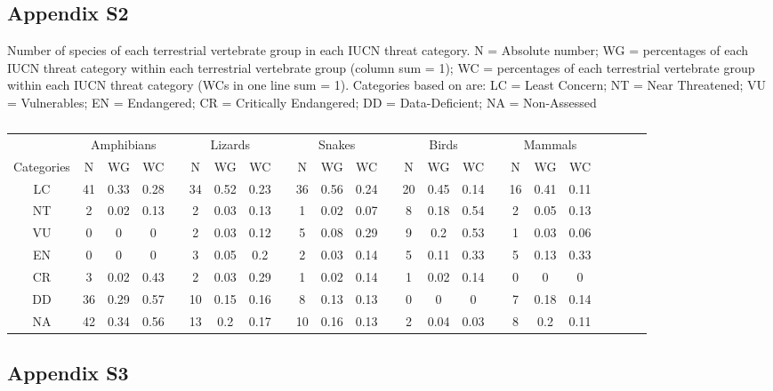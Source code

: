\documentclass[12pt,openright,oneside,a4paper,english]{abntex2}
\begin{document}
\subsection*{Appendix S2}\label{sup:3-s2}

\noindent
Number of species of each terrestrial vertebrate group in each IUCN threat category. N = Absolute number; WG = percentages of each IUCN threat category within each terrestrial vertebrate group (column sum = 1); WC = percentages of each terrestrial vertebrate group within each IUCN threat category (WCs in one line sum = 1). Categories based on \citep{IUCN2022} are: LC = Least Concern; NT = Near Threatened; VU = Vulnerables; EN = Endangered; CR = Critically Endangered; DD = Data-Deficient; NA = Non-Assessed

\begin{table}[H]
	\centering
	\caption*{}
	\scriptsize
	\begin{tabular}{cccccccccccccccccccccccc}
		\hline
		& \multicolumn{3}{c}{Amphibians} && \multicolumn{3}{c}{Lizards} && \multicolumn{3}{c}{Snakes} && \multicolumn{3}{c}{Birds} && \multicolumn{3}{c}{Mammals} \\ \cline{2-4} \cline{6-8} \cline{10-12} \cline{14-16} \cline{18-20}
		Categories & N & WG & WC && N & WG & WC && N & WG & WC && N & WG & WC && N & WG & WC \\ 
		\hline
		LC & 41 & 0.33 & 0.28 && 34 & 0.52 & 0.23 && 36 & 0.56 & 0.24 && 20 & 0.45 & 0.14 && 16 & 0.41 & 0.11 \\
		NT & 2 & 0.02 & 0.13 && 2 & 0.03 & 0.13 && 1 & 0.02 & 0.07 && 8 & 0.18 & 0.54 && 2 & 0.05 & 0.13 \\
		VU & 0 & 0 & 0 && 2 & 0.03 & 0.12 && 5 & 0.08 & 0.29 && 9 & 0.2 & 0.53 && 1 & 0.03 & 0.06 \\
		EN & 0 & 0 & 0 && 3 & 0.05 & 0.2 && 2 & 0.03 & 0.14 && 5 & 0.11 & 0.33 && 5 & 0.13 & 0.33 \\
		CR & 3 & 0.02 & 0.43 && 2 & 0.03 & 0.29 && 1 & 0.02 & 0.14 && 1 & 0.02 & 0.14 && 0 & 0 & 0 \\
		DD & 36 & 0.29 & 0.57 && 10 & 0.15 & 0.16 && 8 & 0.13 & 0.13 && 0 & 0 & 0 && 7 & 0.18 & 0.14 \\
		NA & 42 & 0.34 & 0.56 && 13 & 0.2 & 0.17 && 10 & 0.16 & 0.13 && 2 & 0.04 & 0.03 && 8 & 0.2 & 0.11 \\
		 \hline
	\end{tabular}
\end{table}

\subsection*{Appendix S3}\label{sup:3-s3}
\end{document}
